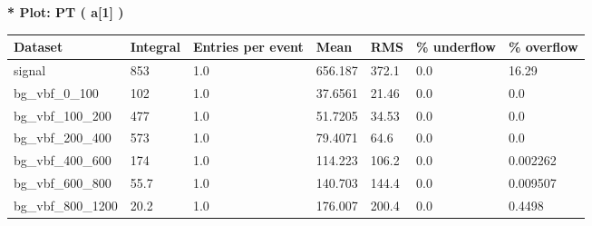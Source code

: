 \documentclass[a4paper, 10pt]{article}
\begin{document}
\textbf{* Plot: PT ( a[1] ) }\\
   \begin{table}[H]
  \begin{center}
    \begin{tabular}{|m{23.0mm}|m{23.0mm}|m{18.0mm}|m{19.0mm}|m{19.0mm}|m{19.0mm}|m{19.0mm}|}
      \hline
      {\cellcolor{yellow}         Dataset}& {\cellcolor{yellow}         Integral}& {\cellcolor{yellow}         Entries per event}& {\cellcolor{yellow}         Mean}& {\cellcolor{yellow}         RMS}& {\cellcolor{yellow}         \% underflow}& {\cellcolor{yellow}         \% overflow}\\
      \hline
      {\cellcolor{white}         signal}& {\cellcolor{white}         853}& {\cellcolor{white}         1.0}& {\cellcolor{white}         656.187}& {\cellcolor{white}         372.1}& {\cellcolor{red}         0.0}& {\cellcolor{red}         16.29}\\
      \hline
      {\cellcolor{white}         bg\_vbf\_0\_100}& {\cellcolor{white}         102}& {\cellcolor{white}         1.0}& {\cellcolor{white}         37.6561}& {\cellcolor{white}         21.46}& {\cellcolor{green}         0.0}& {\cellcolor{green}         0.0}\\
      \hline
      {\cellcolor{white}         bg\_vbf\_100\_200}& {\cellcolor{white}         477}& {\cellcolor{white}         1.0}& {\cellcolor{white}         51.7205}& {\cellcolor{white}         34.53}& {\cellcolor{green}         0.0}& {\cellcolor{green}         0.0}\\
      \hline
      {\cellcolor{white}         bg\_vbf\_200\_400}& {\cellcolor{white}         573}& {\cellcolor{white}         1.0}& {\cellcolor{white}         79.4071}& {\cellcolor{white}         64.6}& {\cellcolor{green}         0.0}& {\cellcolor{green}         0.0}\\
      \hline
      {\cellcolor{white}         bg\_vbf\_400\_600}& {\cellcolor{white}         174}& {\cellcolor{white}         1.0}& {\cellcolor{white}         114.223}& {\cellcolor{white}         106.2}& {\cellcolor{green}         0.0}& {\cellcolor{green}         0.002262}\\
      \hline
      {\cellcolor{white}         bg\_vbf\_600\_800}& {\cellcolor{white}         55.7}& {\cellcolor{white}         1.0}& {\cellcolor{white}         140.703}& {\cellcolor{white}         144.4}& {\cellcolor{green}         0.0}& {\cellcolor{green}         0.009507}\\
      \hline
      {\cellcolor{white}         bg\_vbf\_800\_1200}& {\cellcolor{white}         20.2}& {\cellcolor{white}         1.0}& {\cellcolor{white}         176.007}& {\cellcolor{white}         200.4}& {\cellcolor{green}         0.0}& {\cellcolor{green}         0.4498}\\

\end{tabular}
\end{center}
\end{table}
\end{document}
